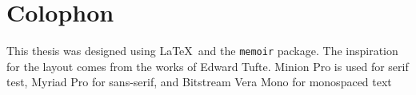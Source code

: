 \pagestyle{empty}
\hfill
\vfill
\section*{Colophon}
This thesis was designed using \LaTeX\ and the \texttt{memoir} package. The inspiration for the layout comes from the works of Edward Tufte. Minion Pro is used for serif test, Myriad Pro for sans-serif, and Bitstream Vera Mono for monospaced text
\bigskip
\noindent
